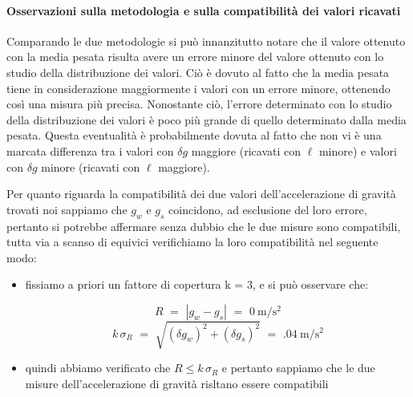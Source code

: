 \paragraph{Osservazioni sulla metodologia e sulla compatibilità dei valori ricavati\\}

Comparando le due metodologie si può innanzitutto notare che il valore ottenuto con la media pesata risulta avere un errore minore del valore ottenuto con lo studio della distribuzione dei valori. Ciò è dovuto al fatto che la media pesata tiene in considerazione maggiormente i valori con un errore minore, ottenendo così una misura più precisa. Nonostante ciò, l'errore determinato con lo studio della distribuzione dei valori è poco più grande di quello determinato dalla media pesata. Questa eventualità è probabilmente dovuta al fatto che non vi è una marcata differenza tra i valori con $\delta g$ maggiore (ricavati con $\ell$ minore) e valori con $\delta g$ minore (ricavati con $\ell$ maggiore).

Per quanto riguarda la compatibilità dei due valori dell'accelerazione di gravità trovati noi sappiamo che $g_w$ e $g_s$ coincidono, ad esclusione del loro errore, pertanto si potrebbe affermare senza dubbio che le due misure sono compatibili, tutta via a scanso di equivici verifichiamo la loro compatibilità nel seguente modo:
\begin{itemize}
	\item{fissiamo a priori un fattore di copertura k = 3, e si può osservare che:
	
		\begin{equation*}
			R \,\, = \,\, |g_w - g_s| \,\, = \,\, \SI{0}{\metre\per\square\second}
		\end{equation*}
		\begin{equation*}
			k\,\sigma_R \,\, = \,\, \sqrt{(\delta g_w)^2 + (\delta g_s)^2} \,\, = \,\, \SI{.04}{\metre\per\square\second}
		\end{equation*}
		}
	\item{quindi abbiamo verificato che $R \leq k\,\sigma_R$ e pertanto sappiamo che le due misure dell'accelerazione di gravità risltano essere compatibili}
\end{itemize}